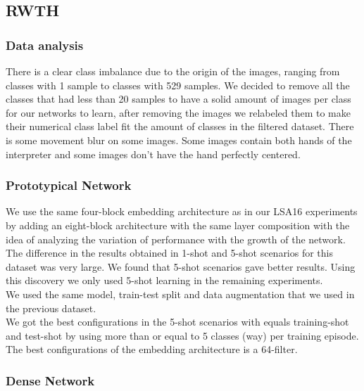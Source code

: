 \documentclass[runningheads,a4paper]{llncs}
\begin{document}
\subsection{RWTH}

\subsubsection{Data analysis}

There is a clear class imbalance due to the origin of the images, ranging from classes with 1 sample to classes with 529 samples. We decided to remove all the classes that had less than 20 samples to have a solid amount of images per class for our networks to learn, after removing the images we relabeled them to make their numerical class label fit the amount of classes in the filtered dataset. There is some movement blur on some images. Some images contain both hands of the interpreter and some images don't have the hand perfectly centered.

\subsubsection{Prototypical Network}

We use the same four-block embedding architecture as in our LSA16 experiments by adding an eight-block architecture with the same layer composition with the idea of analyzing the variation of performance with the growth of the network. \\

The difference in the results obtained in 1-shot and 5-shot scenarios for this dataset was very large. We found that 5-shot scenarios gave better results. Using this discovery we only used 5-shot learning in the remaining experiments. \\

We used the same model, train-test split and data augmentation that we used in the previous dataset. \\

We got the best configurations in the 5-shot scenarios with equals training-shot and test-shot by using more than or equal to 5 classes (way) per training episode. The best configurations of the embedding architecture is a 64-filter.

\subsubsection{Dense Network}
\end{document}
